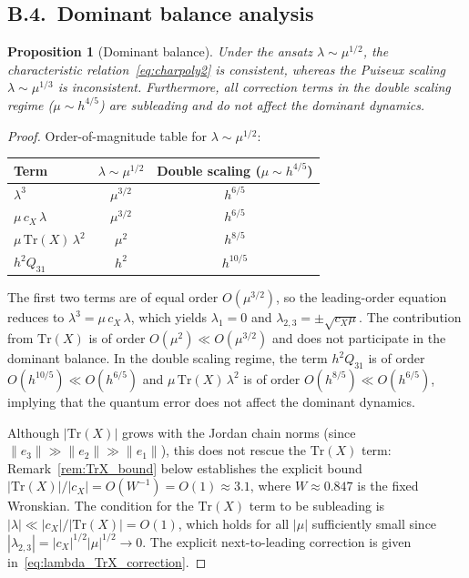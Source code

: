 \documentclass[12pt,a4paper]{amsart}
\newtheorem{proposition}[theorem]{Proposition}
\theoremstyle{remark}
\begin{document}
\subsection*{B.4.~Dominant balance analysis}

\begin{proposition}[Dominant balance]
\label{prop:dominant_balance}
Under the ansatz $\lambda \sim \mu^{1/2}$, the characteristic relation~\eqref{eq:charpoly2} is consistent,
whereas the Puiseux scaling $\lambda \sim \mu^{1/3}$ is inconsistent. Furthermore, all correction
terms in the double scaling regime ($\mu \sim h^{4/5}$) are subleading and do not affect the
dominant dynamics.
\end{proposition}

\begin{proof}
Order-of-magnitude table for $\lambda \sim \mu^{1/2}$:

\medskip
\begin{center}
\begin{tabular}{lcc}
\hline
Term & $\lambda \sim \mu^{1/2}$ & Double scaling ($\mu \sim h^{4/5}$) \\
\hline
$\lambda^3$ & $\mu^{3/2}$ & $h^{6/5}$ \\
$\mu\,c_X\,\lambda$ & $\mu^{3/2}$ & $h^{6/5}$ \\
$\mu\,\mathrm{Tr}(X)\,\lambda^2$ & $\mu^2$ & $h^{8/5}$ \\
$h^2 Q_{31}$ & $h^2$ & $h^{10/5}$ \\
\hline
\end{tabular}
\end{center}
\medskip

The first two terms are of equal order $O(\mu^{3/2})$, so the leading-order equation reduces to
$\lambda^3 = \mu\,c_X\,\lambda$, which yields $\lambda_1 = 0$ and $\lambda_{2,3} = \pm\sqrt{c_X\mu}$.
The contribution from $\mathrm{Tr}(X)$ is of order $O(\mu^2) \ll O(\mu^{3/2})$ and does not participate in
the dominant balance. In the double scaling regime, the term $h^2 Q_{31}$ is of order $O(h^{10/5}) \ll O(h^{6/5})$
and $\mu\,\mathrm{Tr}(X)\,\lambda^2$ is of order $O(h^{8/5}) \ll O(h^{6/5})$, implying that the
quantum error does not affect the dominant dynamics.

Although $|\mathrm{Tr}(X)|$ grows with the Jordan chain norms
(since $\|e_3\| \gg \|e_2\| \gg \|e_1\|$), this does not rescue the $\mathrm{Tr}(X)$ term:
Remark~\ref{rem:TrX_bound} below establishes the explicit bound
$|\mathrm{Tr}(X)|/|c_X| = O(W^{-1}) = O(1) \approx 3.1$,
where $W \approx 0.847$ is the fixed Wronskian.
The condition for the $\mathrm{Tr}(X)$ term to be subleading is
$|\lambda| \ll |c_X|/|\mathrm{Tr}(X)| = O(1)$,
which holds for all $|\mu|$ sufficiently small since $|\lambda_{2,3}| = |c_X|^{1/2}|\mu|^{1/2} \to 0$.
The explicit next-to-leading correction is given in~\eqref{eq:lambda_TrX_correction}.


\end{proof}
\end{document}
